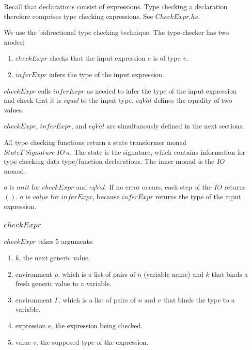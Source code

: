 Recall that declarations consist of expressions. Type checking a declaration therefore comprises type checking expressions. See $CheckExpr.hs$.

We use the bidirectional type checking technique. The type-checker has two modes:

\begin{enumerate}
  \item $checkExpr$ checks that the input expression $e$ is of type $v$.
  \item $inferExpr$ infers the type of the input expression.
\end{enumerate}

$checkExpr$ calls $inferExpr$ as needed to infer the type of the input expression and check that it is \emph{equal} to the input type. $eqVal$ defines the equality of two values.

$checkExpr$, $inferExpr$, and $eqVal$ are simultanously defined in the next sections.

All type checking functions return a state transformer monad $StateT \: Signature \: IO \: a$. The state is the signature, which contains information for type checking data type/function declarations. The inner monad is the $IO$ monad.

$a$ is $unit$ for $checkExpr$ and $eqVal$. If no error occurs, each step of the $IO$ returns $\boldsymbol{()}$. $a$ is $value$ for $inferExpr$, because $inferExpr$ returns the type of the input expression.

\subsubsection{$checkExpr$}
\label{sec:checkExpr}

$checkExpr$ takes 5 arguments:

\begin{enumerate}
  \item $k$, the next generic value.
  \item environment $\rho$, which is a list of pairs of $n$ (variable name) and $k$ that binds a fresh generic value to a variable.
  \item environment $\Gamma$, which is a list of pairs of $n$ and $v$ that binds the type to a variable.
  \item expression $e$, the expression being checked.
  \item value $v$, the supposed type of the expression.
\end{enumerate}

